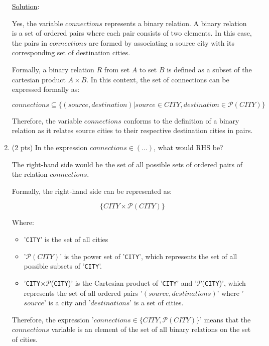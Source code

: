 \documentclass[12pt]{article}
\begin{document}
\begin{spacing}{1.5}
\begin{enumerate}
        \noindent \underline{Solution}:

		      Yes, the variable $connections$ represents a binary relation. A binary relation is a set of ordered pairs where each pair consists of two elements. In this case, the pairs in $connections$ are formed by associating a source city with its corresponding set of destination cities.
		      
		      Formally, a binary relation $R$ from set $A$ to set $B$ is defined as a subset of the cartesian product $A\times B$. In this context, the set of connections can be expressed formally as:
		      
		      $$connections \subseteq \{(source, destination) | source \in CITY, destination \in \mathcal{P}(CITY)\}$$
		      
		      Therefore, the variable $connections$ conforms to the definition of a binary relation as it relates source cities to their respective destination cities in pairs.
		          
		\item (2 pts) In the expression $connections \in (...)$, what would RHS be?
		      
		      The right-hand side would be the set of all possible sets of ordered pairs of the relation $connections$.
		      
		      Formally, the right-hand side can be represented as:
		      
		      $$\{CITY \times \mathcal{P}(CITY)\}$$
		      
		      Where:
		      \begin{itemize}
		      	\item '\texttt{CITY}' is the set of all cities
		      	\item '$\mathcal{P}(CITY)$' is the power set of '\texttt{CITY}', which represents the set of all possible subsets of '\texttt{CITY}'.
		      	\item '\texttt{CITY}$\times \mathcal{P}$(\texttt{CITY})' is the Cartesian product of '\texttt{CITY}' and '$\mathcal{P}$(\texttt{CITY})', which represents the set of all ordered pairs '$(source, destinations)$' where '$source$' is a city and '$destinations$' is a set of cities.
		      \end{itemize}
		      
		      Therefore, the expression '$connections \in \{CITY, \mathcal{P}(CITY)\}$' means that the $connections$ variable is an element of the set of all binary relations on the set of cities.
		      

\end{enumerate}
\end{spacing}
\end{document}

